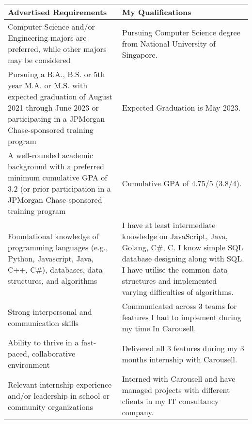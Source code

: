 \documentclass[11pt]{article} %
\begin{document}
\begin{flushleft}
\begin{table}[ht]
    \centering
    \begin{tabular}
    {
        >{\raggedright\arraybackslash}p{7cm} |
        >{\raggedright\arraybackslash}p{10cm}
    }
    \toprule
    \textbf{Advertised Requirements} & \textbf{My Qualifications}\\
    \midrule
    Computer Science and/or Engineering majors are preferred, while other majors may be considered & Pursuing Computer Science degree from National University of Singapore. \\
    \midrule
    Pursuing a B.A., B.S. or 5th year M.A. or M.S. with expected graduation of August 2021 through June 2023 or participating in a JPMorgan Chase-sponsored training program & Expected Graduation is May 2023. \\
    \midrule
    A well-rounded academic background with a preferred minimum cumulative GPA of 3.2 (or prior participation in a JPMorgan Chase-sponsored training program & Cumulative GPA of 4.75/5 (3.8/4). \\
    \midrule
    Foundational knowledge of programming languages (e.g., Python, Javascript, Java, C++, C\#), databases, data structures, and algorithms & I have at least intermediate knowledge on JavaScript, Java, Golang, C\#, C. I know simple SQL database designing along with SQL. I have utilise the common data structures and implemented varying difficulties of algorithms. \\
    \midrule
    Strong interpersonal and communication skills & Communicated across 3 teams for features I had to implement during my time In Carousell. \\
    \midrule
    Ability to thrive in a fast-paced, collaborative environment & Delivered all 3 features during my 3 months internship with Carousell.  \\
    \midrule
    Relevant internship experience and/or leadership in school or community organizations & Interned with Carousell and have managed projects with different clients in my IT consultancy company. \\
    \bottomrule
    \end{tabular}
\end{table}

\end{flushleft}
\end{document}
